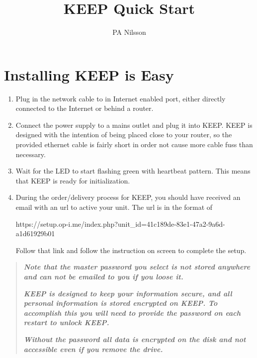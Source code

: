 \documentclass[12pt,a4paper,titlepage]{article}
\author{PA Nilsson}
\title{KEEP Quick Start}
\begin{document}
\FloatBarrier
\section{Installing KEEP is Easy}
	\begin{enumerate}

		\item Plug in the network cable to in Internet enabled port, either directly connected to the Internet or behind a router.

		\item Connect the power supply to a mains outlet and plug it into KEEP. KEEP is designed with the intention of being placed close to your router, so the provided ethernet cable is fairly short in order not cause more cable fuss than necessary.

		\item Wait for the LED to start flashing green with heartbeat pattern. This means that KEEP is ready for initialization.

		\item During the order/delivery process for KEEP, you should have received an email with an url to active your unit. The url is in the format of

\begin{small}
https://setup.op-i.me/index.php?unit\_id=41c189de-83e1-47a2-9a6d-a1d61929b01
\end{small}

Follow that link and follow the instruction on screen to complete the setup.

\end{enumerate}
\begin{quote}
\emph{\textbf{
Note that the master password you select is not stored anywhere and can not be emailed to you if you loose it.
}}

\emph{\textbf{
KEEP is designed to keep your information secure, and all personal information is stored encrypted on KEEP. To accomplish this you will need to provide the password on each restart to unlock KEEP.}}

\emph{\textbf{ Without the password all data is encrypted on the disk and not accessible even if you remove the drive.
}}
\end{quote}


\FloatBarrier
\newpage
\end{document}
